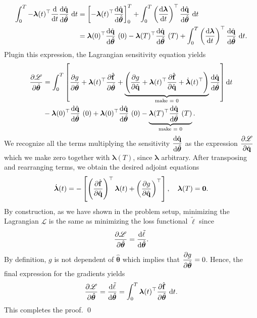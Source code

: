 \begin{align*}
    \int_0^T -\bm{\lambda}(t)^{\top}\dv{t}\dv{\hat{\mathbf{q}}}{\hat{\bm{\theta}}}~\dd t &= \left[ -\bm{\lambda}(t)^{\top}\dv{\hat{\mathbf{q}}}{\hat{\bm{\theta}}}\right]_0^T + \int_0^T \left( \dv{\bm{\lambda}}{t}\right)^{\top}\dv{\hat{\mathbf{q}}}{\hat{\bm{\theta}}}~\dd t\\
    &= \bm{\lambda}(0)^{\top}\dv{\hat{\mathbf{q}}}{\hat{\bm{\theta}}}~(0) - \bm{\lambda}(T)^{\top}\dv{\hat{\mathbf{q}}}{\hat{\bm{\theta}}}~(T) + \int_0^T \left( \dv{\bm{\lambda}}{t}\right)^{\top}\dv{\hat{\mathbf{q}}}{\hat{\bm{\theta}}}~\dd t.
\end{align*}
Plugin this expression, the Lagrangian sensitivity equation  yields\\
\begin{align*}
   \pdv{\mathscr{L}}{\hat{\bm{\theta}}} &= \int_0^T\left[ \pdv{g}{\hat{\bm{\theta}}} + \bm{\lambda}(t)^{\top} \pdv{\hat{\mathbf{f}}}{\hat{\bm{\theta}}} + \underbrace{\left( \pdv{g}{\hat{\mathbf{q}}} + \bm{\lambda}(t)^{\top}\pdv{\hat{\mathbf{f}}}{\hat{\mathbf{q}}}+ \dot{\bm{\lambda}}(t)^{\top}\right)}_{\text{make = 0}} \dv{\hat{\mathbf{q}}}{\hat{\bm{\theta}}} \right]\dd t \\
   & - \bm{\lambda}(0)^{\top}\dv{\hat{\mathbf{q}}}{\hat{\bm{\theta}}}~(0)+\bm{\lambda}(0)^{\top}\dv{\hat{\mathbf{q}}}{\hat{\bm{\theta}}}~(0) - \underbrace{\bm{\lambda}(T)^{\top}\dv{\hat{\mathbf{q}}}{\hat{\bm{\theta}}}~(T)}_{\text{make = 0}}.
\end{align*}
We recognize all the terms multiplying the sensitivity $\displaystyle\dv{\hat{\mathbf{q}}}{\hat{\bm{\theta}}}$ as the expression $\displaystyle\pdv{\mathscr{L}}{\hat{\mathbf{q}}}$ which we make zero together with $\bm{\lambda}(T)$, since $\bm{\lambda}$ arbitrary.
 After transposing and rearranging terms, we obtain the desired adjoint equations\\
\begin{equation*}
    \dot{\bm{\lambda}}(t) = -\left[ \left(\pdv{\hat{\mathbf{f}}}{\hat{\mathbf{q}}}\right)^{\top} \bm{\lambda}(t)  + \left(\pdv{g}{\hat{\mathbf{q}}}\right)^{\top}\right], \quad\bm{\lambda}(T) = \bm{0}.
\end{equation*}
By construction, as we have shown in the problem setup,  minimizing the Lagrangian $\mathscr{L}$ is the same as minimizing the loss functional $\tilde\ell$ since\\
$$\pdv{\mathscr{L}}{\hat{\bm{\theta}}} = \dv{\tilde\ell}{\hat{\bm{\theta}}}.$$
By definition, $g$ is not dependent of $\hat{\bm{\theta}}$ which implies that $\displaystyle\pdv{g}{\hat{\bm{\theta}}}=0$. Hence, the final expression for the gradients yields\\
\begin{equation*}
    \pdv{\mathscr{L}}{\hat{\bm{\theta}}} =\dv{\tilde\ell}{\hat{\bm{\theta}}} = \int_0^T \bm{\lambda}(t)^{\top} \pdv{\hat{\mathbf{f}}}{\hat{\bm{\theta}}}~\dd t.
\end{equation*}
This completes the proof.
\qed

